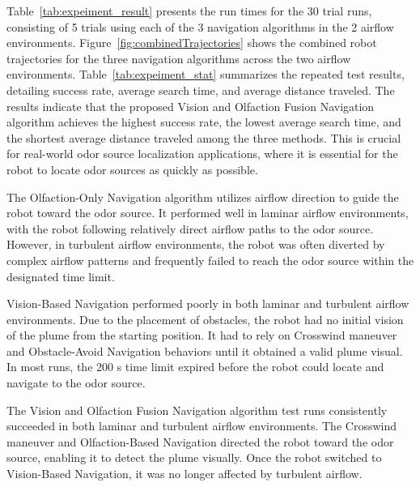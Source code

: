 Table~\ref{tab:expeiment_result} presents the run times for the 30 trial runs, consisting of 5 trials using each of the 3 navigation algorithms in the 2 airflow environments. %
Figure~\ref{fig:combinedTrajectories} shows the combined robot trajectories for the three navigation algorithms across the two airflow environments. Table~\ref{tab:expeiment_stat} summarizes the repeated test results, detailing success rate, average search time, and average distance traveled. The results indicate that the proposed Vision and Olfaction Fusion Navigation algorithm achieves the highest success rate, the lowest average search time, and the shortest average distance traveled among the three methods. This is crucial for real-world odor source localization applications, where it is essential for the robot to locate odor sources as quickly as possible.


The Olfaction-Only Navigation algorithm utilizes airflow direction to guide the robot toward the odor source. It performed well in laminar airflow environments, with the robot following relatively direct airflow paths to the odor source. However, in turbulent airflow environments, the robot was often diverted by complex airflow patterns and frequently failed to reach the odor source within the designated time limit.

Vision-Based Navigation performed poorly in both laminar and turbulent airflow environments. Due to the placement of obstacles, the robot had no initial vision of the plume from the starting position. It had to rely on Crosswind maneuver and Obstacle-Avoid Navigation behaviors until it obtained a valid plume visual. In most runs, the 200 s time limit expired before the robot could locate and navigate to the odor source.

The Vision and Olfaction Fusion Navigation algorithm test runs consistently succeeded in both laminar and turbulent airflow environments. The Crosswind maneuver and Olfaction-Based Navigation directed the robot toward the odor source, enabling it to detect the plume visually. Once the robot switched to Vision-Based Navigation, it was no longer affected by turbulent airflow.

